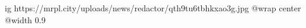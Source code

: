  
 
 
 
 

\ifcmt
  ig https://mrpl.city/uploads/news/redactor/qth9tu6tbhkxao3g.jpg
  @wrap center
  @width 0.9
\fi
